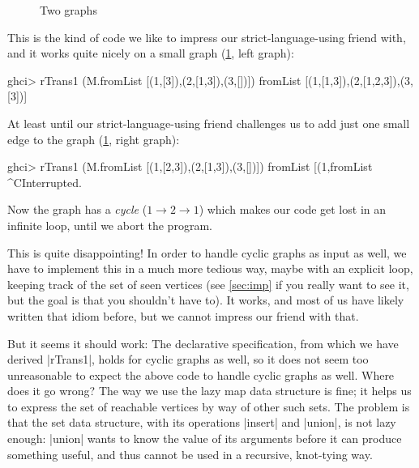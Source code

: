 \documentclass[manuscript,screen,acmsmall,nonacm]{acmart}
\begin{document}
\begin{figure}
\centering
\hfill
\hfill
{}
\hfill
{}
\hfill
\hfill
\strut
\caption{Two graphs}\label{fig:graphs}
\end{figure}

This is the kind of code we like to impress our strict-language-using friend with, and it works quite nicely on a small graph (\cref{fig:graphs}, left graph):
\begin{code}
ghci> rTrans1 (M.fromList [(1,[3]),(2,[1,3]),(3,[])])
fromList [(1,[1,3]),(2,[1,2,3]),(3,[3])]
\end{code}
%
At least until our strict-language-using friend challenges us to add just one small edge to the graph (\cref{fig:graphs}, right graph):
\begin{code}
ghci> rTrans1 (M.fromList [(1,[2,3]),(2,[1,3]),(3,[])])
fromList [(1,fromList ^CInterrupted.
\end{code}
Now the graph has a \emph{cycle} ($1 \to 2 \to 1$) which makes our code get lost in an infinite loop, until we abort the program.

This is quite disappointing! In order to handle cyclic graphs as input as well, we have to implement this in a much more tedious way, maybe with an explicit loop, keeping track of the set of seen vertices (see \cref{sec:imp} if you really want to see it, but the goal is that you shouldn’t have to). It works, and most of us have likely written that idiom before, but we cannot impress our friend with that.

But it seems it should work: The declarative specification, from which we have derived |rTrans1|, holds for cyclic graphs as well, so it does not seem too unreasonable to expect the above code to handle cyclic graphs as well. Where does it go wrong? The way we use the lazy map data structure is fine; it helps us to express the set of reachable vertices by way of other such sets.
The problem is that the set data structure, with its operations |insert| and |union|, is not lazy enough: |union| wants to know the value of its arguments before it can produce something useful, and thus cannot be used in a recursive, knot-tying way.
\end{document}
